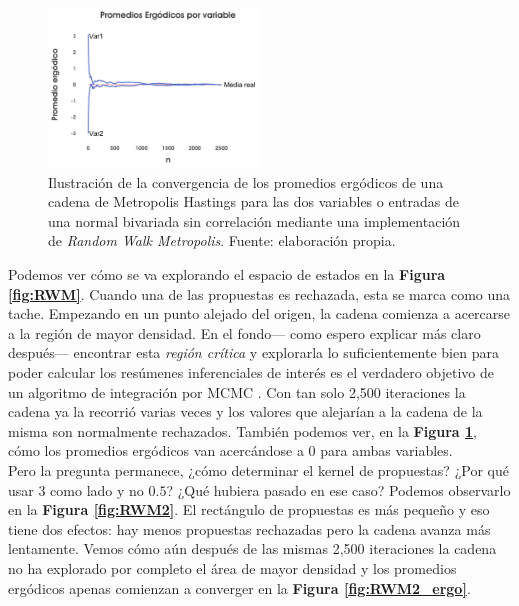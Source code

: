 \begin{figure}[h]
	\centering
	\includegraphics[width=0.5\textwidth]{Figs/Bayes/Ejemplo_RWM_C}
        \caption{Ilustración de la convergencia de los promedios ergódicos de una cadena de Metropolis Hastings para las dos variables o entradas de una normal bivariada sin correlación mediante una implementación de \textit{Random Walk Metropolis}. Fuente: elaboración propia.}\label{fig:RWM_ergo}
\end{figure}

Podemos ver cómo se va explorando el espacio de estados en la \textbf{Figura \ref{fig:RWM}}. Cuando una de las propuestas es rechazada, esta se marca como una tache. Empezando en un punto alejado del origen, la cadena comienza a acercarse a la región de mayor densidad. En el fondo--- como espero explicar más claro después--- encontrar esta \textit{región crítica} y explorarla lo suficientemente bien para poder calcular los resúmenes inferenciales de interés es el verdadero objetivo de un algoritmo de integración por MCMC \parencites{Neal93,Betancourt17}. Con tan solo 2,500 iteraciones la cadena ya la recorrió varias veces y los valores que alejarían a la cadena de la misma son normalmente rechazados. También podemos ver, en la \textbf{Figura \ref{fig:RWM_ergo}}, cómo los promedios ergódicos van acercándose a $0$ para ambas variables.\\

Pero la pregunta permanece, ¿cómo determinar el kernel de propuestas? ¿Por qué usar $3$ como lado y no $0.5$? ¿Qué hubiera pasado en ese caso? Podemos observarlo en la \textbf{Figura \ref{fig:RWM2}}. El rectángulo de propuestas es más pequeño y eso tiene dos efectos: hay menos propuestas rechazadas pero la cadena avanza más lentamente. Vemos cómo aún después de las mismas 2,500 iteraciones la cadena no ha explorado por completo el área de mayor densidad y los promedios ergódicos apenas comienzan a converger en la \textbf{Figura \ref{fig:RWM2_ergo}}.\\ 

